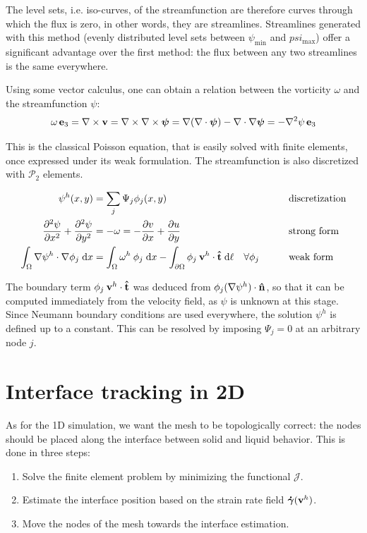 \documentclass[11 pt]{report}
\begin{document}
The level sets, i.e. iso-curves, of the streamfunction are therefore curves through which the flux is zero, in other words, they are streamlines. Streamlines generated with this method (evenly distributed level sets between $\psi_{\min}$ and $psi_{\max}$) offer a significant advantage over the first method: the flux between any two streamlines is the same everywhere.

Using some vector calculus, one can obtain a relation between the vorticity $\omega$ and the streamfunction $\psi$:
\begin{equation}
    \omega \,\mathbf{e}_3 = \nabla \times \mathbf{v} = \nabla \times \nabla \times \boldsymbol\psi = \nabla (\nabla \cdot \boldsymbol\psi) - \nabla \cdot \nabla \boldsymbol\psi = - \nabla^2 \psi \,\mathbf{e}_3
\end{equation}

This is the classical Poisson equation, that is easily solved with finite elements, once expressed under its weak formulation. The streamfunction is also discretized with $\mathcal{P}_2$ elements.
\begin{empheqboxed}
    \begin{equation}
        \begin{aligned}
            \psi^h(x,y) &= \sum_{j} \Psi_j \phi_j(x,y) && \text{discretization}\\
            \pdv[2]{\psi}{x} + \pdv[2]{\psi}{y} &= -\omega = -\pdv{v}{x} + \pdv{u}{y} && \text{strong form}\\
            \int_{\Omega} \nabla \psi^h \cdot \nabla \phi_j \;\dd x &= \int_{\Omega} \omega^h \:\phi_j\; \dd x - \int_{\partial \Omega} \phi_j \: \mathbf{v}^h \cdot \mathbf{\hat t} \;\dd \ell \quad \forall \phi_j\qquad && \text{weak form}
        \end{aligned}
    \end{equation}
\end{empheqboxed}
The boundary term $\phi_j \:\mathbf{v}^h\cdot \mathbf{\hat t}$ was deduced from $\phi_j (\nabla \psi^h) \cdot \mathbf{\hat n} $, so that it can be computed immediately from the velocity field, as $\psi$ is unknown at this stage. Since Neumann boundary conditions are used everywhere, the solution $\psi^h$ is defined up to a constant. This can be resolved by imposing $\Psi_j=0$ at an arbitrary node $j$.

\section{Interface tracking in 2D}
As for the 1D simulation, we want the mesh to be topologically correct: the nodes should be placed along the interface between solid and liquid behavior. This is done in three steps:
\begin{enumerate}
    \item Solve the finite element problem by minimizing the functional $\mathcal{J}$.
    \item Estimate the interface position based on the strain rate field $\boldsymbol{\dot \gamma}(\mathbf{v}^h)$.
    \item Move the nodes of the mesh towards the interface estimation.
\end{enumerate}
\end{document}
